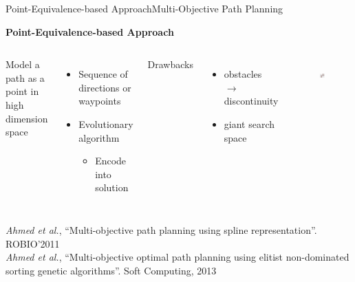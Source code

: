 \begin{frame}{Point-Equivalence-based Approach}{Multi-Objective Path Planning}

{\bf Point-Equivalence-based Approach}

\begin{columns}
Model a path as a point in high dimension space
\begin{itemize}
\item Sequence of directions or waypoints
\item Evolutionary algorithm
\begin{itemize}
\item Encode into solution
\end{itemize}
\end{itemize}
Drawbacks
\begin{itemize}
\item obstacles $ \rightarrow $ discontinuity
\item giant search space
\end{itemize}
	\begin{figure}
		\centering
		\includegraphics[width=\linewidth]{figure/chain_based_solution.png}
		\label{fig:chain_based_solution}
	\end{figure}
\end{columns}

\vfill
\vfill

{\tiny {\it Ahmed et al.}, ``Multi-objective path planning using spline representation''. ROBIO'2011} \\
{\tiny {\it Ahmed et al.}, ``Multi-objective optimal path planning using elitist non-dominated sorting genetic algorithms''. Soft Computing, 2013}

\end{frame}